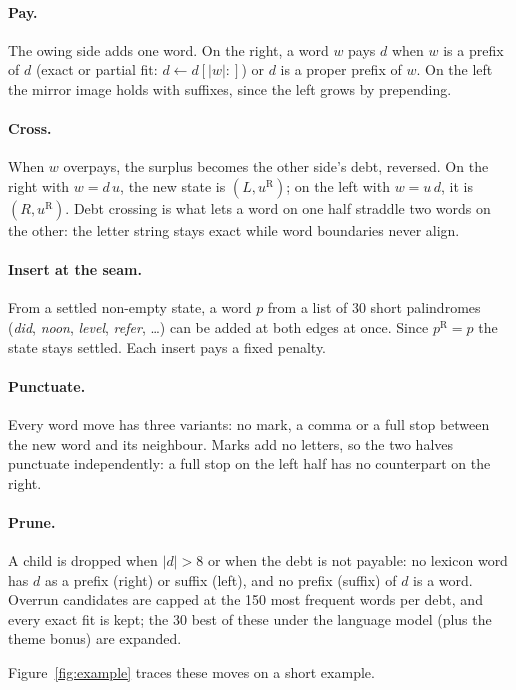 \documentclass[11pt]{article}
\newcommand{\w}[1]{\emph{#1}}
\begin{document}
\paragraph{Pay.} The owing side adds one word. On the right, a word $w$ pays $d$ when $w$ is a prefix of $d$ (exact or partial fit: $d \leftarrow d[|w|{:}]$) or $d$ is a proper prefix of $w$. On the left the mirror image holds with suffixes, since the left grows by prepending.

\paragraph{Cross.} When $w$ overpays, the surplus becomes the other side's debt, reversed. On the right with $w = d\,u$, the new state is $(L, u^{\mathrm{R}})$; on the left with $w = u\,d$, it is $(R, u^{\mathrm{R}})$. Debt crossing is what lets a word on one half straddle two words on the other: the letter string stays exact while word boundaries never align.

\paragraph{Insert at the seam.} From a settled non-empty state, a word $p$ from a list of 30 short palindromes (\w{did}, \w{noon}, \w{level}, \w{refer}, \dots) can be added at both edges at once. Since $p^{\mathrm{R}} = p$ the state stays settled. Each insert pays a fixed penalty.

\paragraph{Punctuate.} Every word move has three variants: no mark, a comma or a full stop between the new word and its neighbour. Marks add no letters, so the two halves punctuate independently: a full stop on the left half has no counterpart on the right.

\paragraph{Prune.} A child is dropped when $|d| > 8$ or when the debt is not payable: no lexicon word has $d$ as a prefix (right) or suffix (left), and no prefix (suffix) of $d$ is a word. Overrun candidates are capped at the 150 most frequent words per debt, and every exact fit is kept; the 30 best of these under the language model (plus the theme bonus) are expanded.

Figure~\ref{fig:example} traces these moves on a short example.
\end{document}

